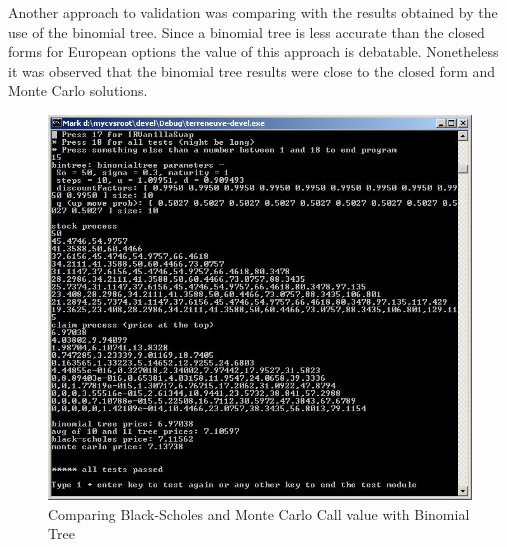 Another approach to validation was comparing with the results
obtained by the use of the binomial tree.  Since a binomial tree is
less accurate than the closed forms for European options the value
of this approach is debatable.  Nonetheless it was observed that the
binomial tree results were close to the closed form and Monte Carlo
solutions.

\begin{figure}[htbp]
\begin{center}
        \includegraphics[width=12cm]{blackscholes-bintree.jpg}
        \caption{Comparing Black-Scholes and Monte Carlo Call value with Binomial Tree}
\end{center}
\end{figure}
